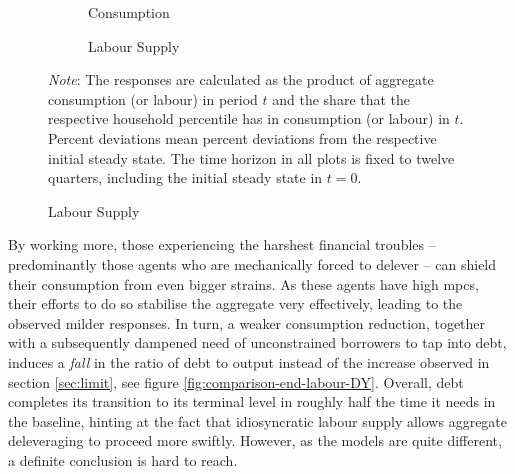 \documentclass[a4paper,12pt]{article} %
\numberwithin{equation}{section} %
\numberwithin{figure}{section}
\numberwithin{table}{section}
\begin{document}
\begin{figure}[t]
    \centering
    \caption{Endogenous Labour Model -- Shock to Borrowing Limit: \\ Consumption and Labour Responses by Percentiles}
    \label{fig:end-L-permanent-limit-percentiles}
    \begin{subfigure}[b]{0.49\textwidth}
    \caption{Consumption}
    \label{fig:end-L-permanent-limit-percentiles-c}
         \centering
         
     \end{subfigure}
     \hfill
    \begin{subfigure}[b]{0.49\textwidth}
    \caption{Labour Supply}
    \label{fig:end-L-permanent-limit-percentiles-n}
         \centering
         
     \end{subfigure}
     
     \vspace{10pt}
     
     \justifying
     \footnotesize
	\textit{Note}: The responses are calculated as the product of aggregate consumption (or labour) in period $t$ and the share that the respective household percentile has in consumption (or labour) in $t$. Percent deviations mean percent deviations from the respective initial steady state. The time horizon in all plots is fixed to twelve quarters, including the initial steady state in $t=0$.
\end{figure}

By working more, those experiencing the harshest financial troubles -- predominantly those agents who are mechanically forced to delever -- can shield their consumption from even bigger strains. As these agents have high \Gls{mpc}s, their efforts to do so stabilise the aggregate very effectively, leading to the observed milder responses. In turn, a weaker consumption reduction, together with a subsequently dampened need of unconstrained borrowers to tap into debt, induces a \textit{fall} in the ratio of debt to output instead of the increase observed in section \ref{sec:limit}, see figure \ref{fig:comparison-end-labour-DY}. Overall, debt completes its transition to its terminal level in roughly half the time it needs in the baseline, hinting at the fact that idiosyncratic labour supply allows aggregate deleveraging to proceed more swiftly. However, as the models are quite different, a definite conclusion is hard to reach.
\end{document}
